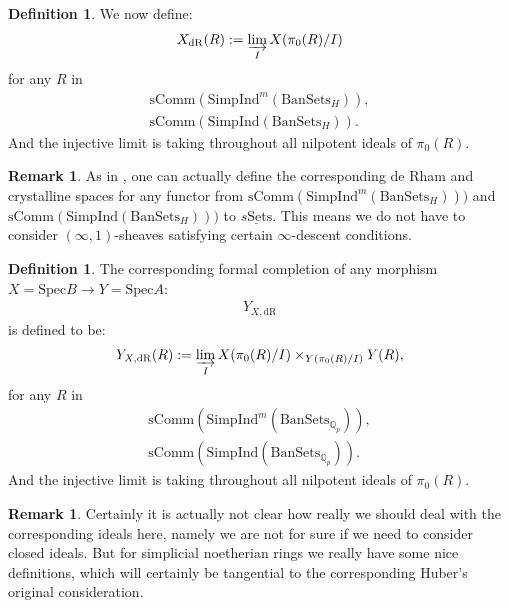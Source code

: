 \documentclass[12pt]{amsart}
\theoremstyle{definition}
\newtheorem{definition}[theorem]{Definition}
\newtheorem{remark}[theorem]{Remark}
\numberwithin{equation}{section}
\begin{document}
\begin{definition}
We now define:
\begin{align}
X_\mathrm{dR}(R):=\varinjlim_{I} X(\pi_0(R)/I)	
\end{align}
for any $R$ in 
\begin{align}
\mathrm{sComm}(\mathrm{Simp}\mathrm{Ind}^m(\mathrm{BanSets}_{H})),\\
\mathrm{sComm}(\mathrm{Simp}\mathrm{Ind}(\mathrm{BanSets}_{H})).	
\end{align}
And the injective limit is taking throughout all nilpotent ideals of $\pi_0(R)$. 	
\end{definition}



\begin{remark}
As in \cite[Definition 1.1, Remark 1.2]{R}, one can actually define the corresponding de Rham and crystalline spaces for any functor from $\mathrm{sComm}(\mathrm{Simp}\mathrm{Ind}^m(\mathrm{BanSets}_{H})))	$ and $\mathrm{sComm}(\mathrm{Simp}\mathrm{Ind}(\mathrm{BanSets}_{H})))$ to $\underline{s\mathrm{Sets}} $. This means we do not have to consider $(\infty,1)$-sheaves satisfying certain $\infty$-descent conditions. 
\end{remark}






\begin{definition}
The corresponding formal completion of any morphism $X=\mathrm{Spec}B\rightarrow Y=\mathrm{Spec}A$:
\begin{align}
Y_{X,\mathrm{dR}}	
\end{align}
is defined to be:
\begin{align}
Y_{X,\mathrm{dR}}(R):=\varinjlim_{I} X(\pi_0(R)/I)\times_{Y(\pi_0(R)/I)}	Y(R),
\end{align}
for any $R$ in 
\begin{align}
\mathrm{sComm}(\mathrm{Simp}\mathrm{Ind}^m(\mathrm{BanSets}_{\mathbb{Q}_p})),\\
\mathrm{sComm}(\mathrm{Simp}\mathrm{Ind}(\mathrm{BanSets}_{\mathbb{Q}_p})).	
\end{align}
And the injective limit is taking throughout all nilpotent ideals of $\pi_0(R)$.	
\end{definition}




\begin{remark}
Certainly it is actually not clear how really we should deal with the corresponding ideals here, namely we are not for sure if we need to consider closed ideals. But for simplicial noetherian rings we really have some nice definitions, which will certainly be tangential to the corresponding Huber's original consideration.
\end{remark}
\end{document}
